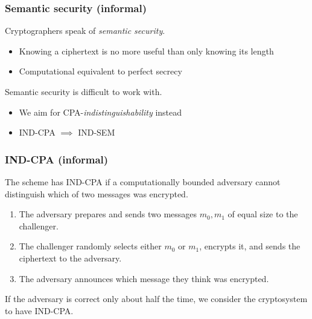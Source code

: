 \begin{frame}
  \frametitle{Semantic security (informal)}

  Cryptographers speak of \emph{semantic security}.
  \begin{itemize}[<+(1)->]
    \item Knowing a ciphertext is no more useful than only knowing its length
    \item Computational equivalent to perfect secrecy
  \end{itemize}

  \vspace*{1em}

  \pause
  Semantic security is difficult to work with.
  \begin{itemize}[<+(1)->]
    \item We aim for CPA-\emph{indistinguishability} instead
    \item IND-CPA $\implies$ IND-SEM
  \end{itemize}
\end{frame}

\begin{frame}
  \frametitle{IND-CPA (informal)}

  The scheme has IND-CPA if a computationally bounded adversary cannot distinguish which of two messages was encrypted.
  \begin{enumerate}[<+(1)->]
    \item The adversary prepares and sends two messages $m_0, m_1$ of equal size to the challenger.
    \item The challenger randomly selects either $m_0$ or $m_1$, encrypts it, and sends the ciphertext to the adversary.
    \item The adversary announces which message they think was encrypted.
  \end{enumerate}

  \pause
  If the adversary is correct only about half the time, we consider the cryptosystem to have IND-CPA.
\end{frame}

